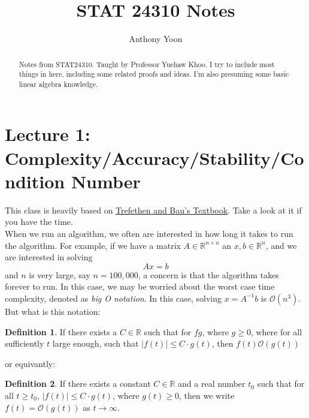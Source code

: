 \documentclass[12pt]{article}
\title{STAT 24310 Notes}
\author{Anthony Yoon}
\theoremstyle{definition}
\newtheorem{definition}{Definition}[section]
\newcommand{\R}{\mathbb{R}}
\begin{document}
\maketitle
\tableofcontents
\begin{abstract}
    Notes from STAT24310. Taught by Professor Yuehaw Khoo. I try to include most things in here, including some related proofs and ideas. I'm also presuming some basic linear algebra knowledge. 
\end{abstract}
\newpage
\section{Lecture 1: Complexity/Accuracy/Stability/Condition Number}
This class is heavily based on \href{https://www.stat.uchicago.edu/~lekheng/courses/309/books/Trefethen-Bau.pdf}{Trefethen and Bau's Textbook}. Take a look at it if you have the time. \\
When we run an algorithm, we often are interested in how long it takes to run the algorithm. For example, if we have a matrix $A \in \R^{n \times n}$ an $x, b \in \R^n$, and we are interested in solving 
\[
Ax = b
\]
and $n$ is very large, say $ n = 100,000$, a concern is that the algorithm takes forever to run. In this case, we may be worried about the worst case time complexity, denoted as \emph{big O notation}. In this case, solving $x = A^{-1} b$ is $\mathcal{O}(n^3)$. But what is this notation: 

\begin{definition}
  If there exists a $C \in \R$ such that for $f g$, where $g \geq 0$, where for all sufficiently $t$ large enough, such that $|f(t)| \leq C \cdot g(t)$, then $f(t) \mathcal{O}(g(t))$ 
\end{definition}
or equivantly:
\begin{definition}
  If there exists a constant \( C \in \mathbb{R} \) and a real number \( t_0 \) such that for all \( t \geq t_0 \), \( |f(t)| \leq C \cdot g(t) \), where \( g(t) \geq 0 \), then we write \( f(t) = \mathcal{O}(g(t)) \) as \( t \to \infty \).
\end{definition}



\end{document}
